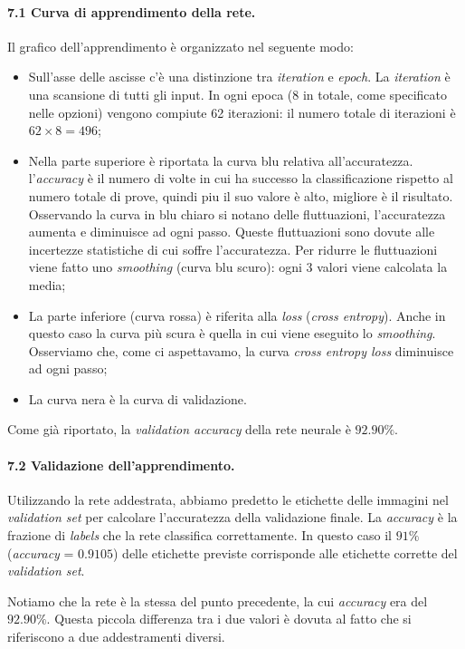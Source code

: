 \documentclass[a4paper,12pt]{article}
\begin{document}
\paragraph{7.1 Curva di apprendimento della rete.} Il grafico dell'apprendimento è organizzato nel seguente modo:
\begin{itemize}
    \item Sull'asse delle ascisse c'è una distinzione tra \emph{iteration} e \emph{epoch}. La \emph{iteration} è una scansione di tutti gli input. In ogni epoca (8 in totale, come specificato nelle opzioni) vengono compiute 62 iterazioni: il numero totale di iterazioni è $62\times8=496$; 
    \item Nella parte superiore è riportata la curva blu relativa all'accuratezza. l'\emph{accuracy} è il numero di volte in cui ha successo la classificazione rispetto al numero totale di prove, quindi piu il suo valore è alto, migliore è il risultato. Osservando la curva in blu chiaro si notano delle fluttuazioni, l'accuratezza aumenta e diminuisce ad ogni passo. Queste fluttuazioni sono dovute alle incertezze statistiche di cui soffre l'accuratezza. Per ridurre le fluttuazioni viene fatto uno \emph{smoothing} (curva blu scuro): ogni 3 valori viene calcolata la media;
    \item La parte inferiore (curva rossa) è riferita alla \emph{loss} (\emph{cross entropy}). Anche in questo caso la curva più scura è quella in cui viene eseguito lo \emph{smoothing}. Osserviamo che, come ci aspettavamo, la curva \emph{cross entropy loss} diminuisce ad ogni passo;
    \item La curva nera è la curva di validazione.
\end{itemize}
Come già riportato, la \emph{validation accuracy} della rete neurale è $92.90\%$.


\paragraph{7.2 Validazione dell'apprendimento.} Utilizzando la rete addestrata, abbiamo predetto le etichette delle immagini nel \emph{validation set} per calcolare l'accuratezza della validazione finale. La \emph{accuracy} è la frazione di \emph{labels} che la rete classifica correttamente. In questo caso il $91\%$ (\emph{accuracy} = $0.9105$) delle etichette previste corrisponde alle etichette corrette del \emph{validation set}. 

Notiamo che la rete è la stessa del punto precedente, la cui \emph{accuracy} era del $92.90\%$. Questa piccola differenza tra i due valori è dovuta al fatto che si riferiscono a due addestramenti diversi. 
\end{document}
